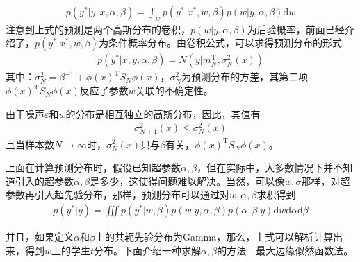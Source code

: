         \begin{align*}
        p(y^*|y,x,\alpha,\beta) = \int_w p(y^*|x^*,w,\beta)p(w|y,\alpha,\beta)\mathrm{d}w
        \end{align*}
        注意到上式的预测是两个高斯分布的卷积，$p(w|y,\alpha,\beta)$为后验概率，前面已经介绍了，$p(y^*|x^*,w,\beta)$为条件概率分布。由卷积公式，可以求得预测分布的形式
        \begin{align*}
        p(y^*|x,y,\alpha,\beta) = N(y|m_N^\mathrm{T},\sigma_N^2(x))
        \end{align*}
        其中：$\sigma_N^2 = \beta^{-1} + \phi(x)^\mathrm{T}S_N\phi(x)$，$\sigma_N^2$为预测分布的方差，其第二项$\phi(x)^\mathrm{T}S_N\phi(x)$反应了参数$w$关联的不确定性。
        \par
        由于噪声$\varepsilon$和$w$的分布是相互独立的高斯分布，因此，其值有
        \begin{align*}
        \sigma_{N+1}^2(x) \leqslant \sigma_N^2(x)
        \end{align*}
        且当样本数$N\rightarrow \infty$时，$\sigma_N^2(x)$只与$\beta$有关，$\phi(x)^\mathrm{T}S_N\phi(x)$。
        \par
        上面在计算预测分布时，假设已知超参数$\alpha,\beta$，但在实际中，大多数情况下并不知道引入的超参数$\alpha,\beta$是多少，这使得问题难以解决。当然，可以像$w,\sigma$那样，对超参数再引入超先验分布，那样，预测分布可以通过对$w,\alpha,\beta$求积得到
        \begin{align*}
        p(y^*|y) = \iiint p (y^*|w,\beta)p(w|y,\alpha,\beta)p(\alpha,\beta|y)\mathrm{d}w\mathrm{d}\alpha\mathrm{d}\beta
        \end{align*}
        \par
        并且，如果定义$\alpha$和$\beta$上的共轭先验分布为Gamma，那么，上式可以解析计算出来，得到$w$上的学生$t$分布。下面介绍一种求解$\alpha,\beta$的方法 - 最大边缘似然函数法。
